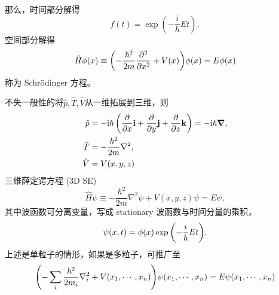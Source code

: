 那么，时间部分解得
\begin{equation}
f (t) = \exp \left( - \frac{i}{\hbar} E t \right),
\end{equation}
空间部分解得
\begin{equation}
\hat H \phi(x) \equiv \qty(- \frac{\hbar^2}{2 m} \pdv[2]{x} + V (x)) \phi(x) = E \phi(x)
\end{equation}
称为 Schr\"odinger 方程。


不失一般性的将$ \hat p, \hat T, \hat V $从一维拓展到三维，则
\begin{align}
\hat p &= -\mathrm{i}\hbar \left(\pdv{x}\vb{i} + \pdv{y}\vb{j} + \pdv{z}\vb{k}\right) = -\mathrm{i}\hbar \bm\nabla, \\
\hat T &= -\frac{\hbar^2}{2m}\nabla^2, \\
\hat V &= V(x,y,z)
\end{align}
三维薛定谔方程 (3D SE)
\begin{equation}
\hat H \psi %
\equiv - \frac{\hbar^2}{2 m} \nabla^2 \psi + V (x, y, z) \psi = E \psi,
\end{equation}
其中波函数可分离变量，写成 stationary 波函数与时间分量的乘积，
\begin{equation}
\psi(x,t) = \phi(x) \exp \qty( -\dfrac{i}{\hbar} Et).
\end{equation}
上述是单粒子的情形，如果是多粒子，可推广至
\begin{equation}
\qty( -\sum_i \dfrac{\hbar^2}{2m_i}\nabla_i^2 + V(x_1, \cdots, x_n)) \psi(x_1,\cdots,x_n) = E \psi(x_1,\cdots,x_n)
\end{equation}

